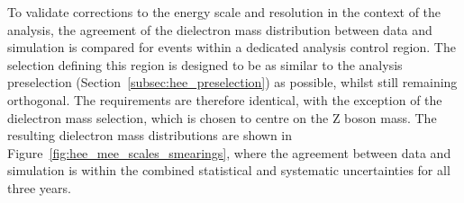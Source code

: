 
To validate corrections to the energy scale and resolution in the context of the \Hee analysis, the agreement of the dielectron mass distribution between data and simulation is compared for \Zee events within a dedicated analysis control region. The selection defining this region is designed to be as similar to the analysis preselection (Section~\ref{subsec:hee_preselection}) as possible, whilst still remaining orthogonal. The requirements are therefore identical, with the exception of the dielectron mass selection, which is chosen to centre on the $\mathrm{Z}$ boson mass. The resulting dielectron mass distributions are shown in Figure~\ref{fig:hee_mee_scales_smearings}, where the agreement between data and simulation is within the combined statistical and systematic uncertainties for all three years.
    
